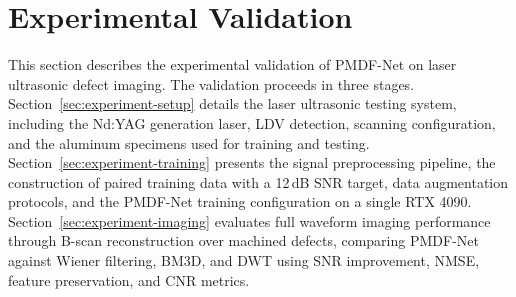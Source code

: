 \section{Experimental Validation}
\label{sec:experiments}

This section describes the experimental validation of PMDF-Net on laser ultrasonic defect imaging. The validation proceeds in three stages. Section~\ref{sec:experiment-setup} details the laser ultrasonic testing system, including the Nd:YAG generation laser, LDV detection, scanning configuration, and the aluminum specimens used for training and testing. Section~\ref{sec:experiment-training} presents the signal preprocessing pipeline, the construction of paired training data with a 12\,dB SNR target, data augmentation protocols, and the PMDF-Net training configuration on a single RTX 4090. Section~\ref{sec:experiment-imaging} evaluates full waveform imaging performance through B-scan reconstruction over machined defects, comparing PMDF-Net against Wiener filtering, BM3D, and DWT using SNR improvement, NMSE, feature preservation, and CNR metrics.

